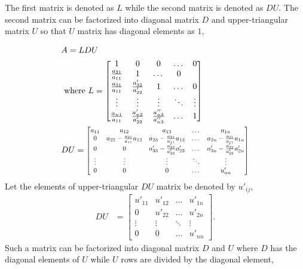 \documentclass[twocolumn]{article}
\begin{document}
% 
The  first  matrix is denoted   as  $L$   while the   second matrix  is  denoted
as $DU$.  The second  matrix    can  be   factorized into   diagonal matrix  $D$
and
upper-triangular matrix  $U$ so that $U$ matrix has diagonal elements as $1$,

\begin{align*}
  &A=LDU\\
  &\text{ where   } L =  \begin{bmatrix} 1  & 0  &  0 &  \dots  & 0 \\
    \frac{a_{21}}{a_{11}} & 1  & \dots  &   0  \\
    \frac{a_{31}}{a_{11}} & \frac{a'_{32}}{a'_{22}}  & 1 & \dots  &   0  \\
    \vdots  & \vdots &  \vdots  &   \ddots  &  \vdots   \\
    \frac{a_{n1}}{a_{11}} & \frac{a'_{n2}}{a'_{22}} &  \frac{a''_{n3}}{a''_{n3}}   &  \dots  & 1
  \end{bmatrix}\\
  &DU = \scalebox{0.8}{\mbox{$\begin{bmatrix}
        a_{11} & a_{12}  &  a_{13} &     \dots &  a_{1n} \\
        0 & a_{22}-\frac{a_{21}}{a_{11}}a_{12}  & a_{23}-\frac{a_{21}}{a_{11}}a_{13} &  \dots &  a_{2n} -\frac{a_{21}}{a_{11}}a_{1n}\\
        0 & 0 &  a'_{33}-\frac{a'_{32}}{a'_{22}}a'_{23} &     \dots &  a'_{3n}-\frac{a'_{32}}{a'_{22}}a'_{2n} \\
        \vdots &  \vdots  & \vdots &  \ddots & \vdots \\
        0 & 0  &  0&   \dots &  u'_{nn}
      \end{bmatrix}$}}
\end{align*}
% 
Let the elements of upper-triangular $DU$ matrix  be denoted  by $u'_{ij}$,
%
\begin{align*}
  DU &= \begin{bmatrix}
    u'_{11} & u'_{12}  &   \dots &  u'_{1n} \\
    0 & u'_{22}  &   \dots &  u'_{2n} \\
    \vdots &  \vdots  & \ddots & \vdots \\
    0 & 0  &   \dots &  u'_{nn}
      \end{bmatrix}.
\end{align*}
%
Such  a matrix  can be factorized into diagonal  matrix  $D$  and $U$
where $D$ has the diagonal elements of $U$ while  $U$  rows  are  divided  by
the  diagonal element,
%
\end{document}
